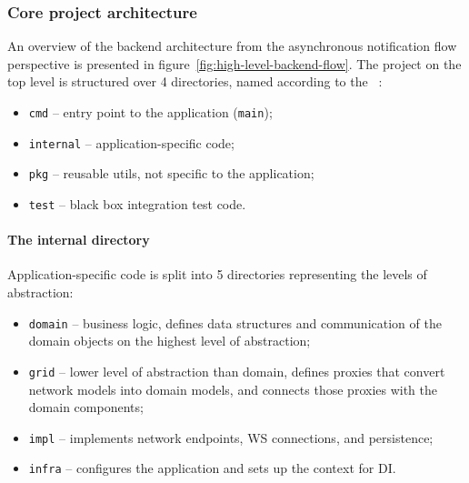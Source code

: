 \subsubsection{Core project architecture}\label{sec:core-project-architecture}

An overview of the backend architecture
from the asynchronous notification flow perspective
is presented in figure~\ref{fig:high-level-backend-flow}.
The project on the top level is structured over 4 directories,
named according to
the ~\cite{quest_standard_2022}:

\begin{itemize}
      \item
            \texttt{cmd} -- entry point to the application (\texttt{main});
      \item
            \texttt{internal} -- application-specific code;
      \item
            \texttt{pkg} -- reusable utils, not specific to the application;
      \item
            \texttt{test} -- black box integration test code.
\end{itemize}

\paragraph*{The internal directory}\label{sec:the-internal-directory}

Application-specific code is split into 5 directories
representing the levels of abstraction:

\begin{itemize}
      \item
            \texttt{domain} -- business logic,
            defines data structures and communication of the domain objects
            on the highest level of abstraction;
      \item
            \texttt{grid} -- lower level of abstraction than domain,
            defines proxies that convert network models into domain models,
            and connects those proxies with the domain components;
      \item
            \texttt{impl} -- implements network endpoints,
            \ac{WS} connections, and persistence;
      \item
            \texttt{infra} -- configures the application
            and sets up the context for \ac{DI}.
\end{itemize}

